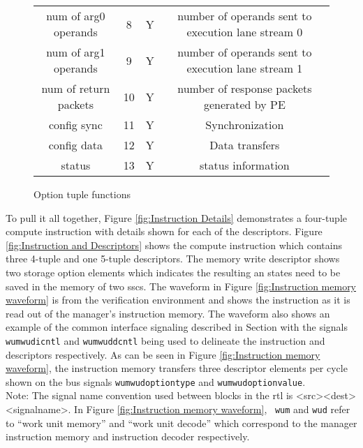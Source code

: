 \begin{figure}[!t]
\begin{minipage}{1\textwidth}
\begin{minipage}{0.85\textwidth}
\begin{adjustbox}{width=1\textwidth}
\begin{tabular}{ |c|c|c|c|  }
              num of arg0 operands             &    8   &  Y&  number of operands sent to execution lane stream 0\\
              num of arg1 operands             &    9   &  Y&  number of operands sent to execution lane stream 1\\
              num of return packets            &    10  &  Y&  number of response packets generated by PE \\
              config sync                      &    11  &  Y&  Synchronization \\
              config data                      &    12  &  Y&  Data transfers\\
              status                           &    13  &  Y&  status information \\
              \hline
            \end{tabular}
        \end{adjustbox}
        \caption{Option tuple functions}
        \label{tab:Option tuple functions}
    \end{minipage}
  \end{minipage}
\end{figure}


To pull it all together, Figure \ref{fig:Instruction Details} demonstrates a four-tuple compute instruction with details shown for each of the descriptors.
Figure \ref{fig:Instruction and Descriptors} shows the compute instruction which contains three 4-tuple and one 5-tuple descriptors.
The memory write descriptor shows two storage option elements which indicates the resulting \ac{an} states need to be saved in the memory of two \acp{ssc}.
The waveform in Figure \ref{fig:Instruction memory waveform} is from the verification environment and shows the instruction as it is read out of the manager's instruction memory.
The waveform also shows an example of the common interface signaling described in Section \label{sec:Common Bus Signalling} with the signals \texttt{wum\textunderscore\textunderscore wud\textunderscore\textunderscore icntl} and \texttt{wum\textunderscore\textunderscore wud\textunderscore\textunderscore dcntl} being used to delineate the instruction and descriptors respectively.
As can be seen in Figure \ref{fig:Instruction memory waveform}, the instruction memory transfers three descriptor elements per cycle shown on the bus signals \texttt{wum\textunderscore\textunderscore wud\textunderscore\textunderscore option\textunderscore type} and \texttt{wum\textunderscore\textunderscore wud\textunderscore\textunderscore option\textunderscore value}.
\\
Note: The signal name convention used between blocks in the \ac{rtl} is <src>\textunderscore\textunderscore <dest>\textunderscore\textunderscore <signal\textunderscore\textunderscore  name>. In Figure \ref{fig:Instruction memory waveform},~ \texttt{wum} and \texttt{wud} refer to ``work unit memory'' and ``work unit decode''
which correspond to the manager instruction memory and instruction decoder respectively.

